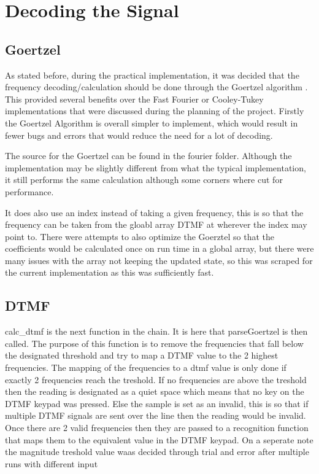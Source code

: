 \documentclass{cce2014-design}
\begin{document}
\section{Decoding the Signal}
\subsection{Goertzel}
As stated before, during the practical implementation, it was decided that the 
frequency decoding/calculation should be done through the Goertzel algorithm 
\cite{goertzel}. This provided several benefits over the 
Fast Fourier or Cooley-Tukey implementations that were discussed during the 
planning of the project. Firstly the Goertzel Algorithm is overall simpler to 
implement, which would result in fewer bugs and errors that would reduce the 
need for a lot of decoding.

The source for the Goertzel can be found in the fourier folder. Although the
implementation may be slightly different from what the typical implementation,
it still performs the same calculation although some corners where cut for
performance.

It does also use an index instead of taking a given frequency, this is so that
the frequency can be taken from the gloabl array DTMF at wherever the index may
point to. There were attempts to also optimize the Goerztel so that the
coefficients would be calculated once on run time in a global array, but there 
were many issues with the array not keeping the updated state, so this was scraped
for the current implementation as this was sufficiently fast.

\subsection{DTMF}
calc\_dtmf is the next function in the chain. It is here that parseGoertzel 
is then called. The purpose of this function is to remove the frequencies 
that fall below the designated threshold and try to map a DTMF value to the 
2 highest frequencies. The mapping of the frequencies to a dtmf value is only 
done if exactly 2 frequencies reach the treshold. If no frequencies are above 
the treshold then the reading is designated as a quiet space which means that 
no key on the DTMF keypad was pressed. Else the sample is set as an invalid, this 
is so that if multiple DTMF signals are sent over the line then the reading would
be invalid. Once there are 2 valid frequencies then they are passed to a 
recognition function that maps them to the equivalent value in the DTMF keypad.
On a seperate note the magnitude treshold value waas decided through trial and
error after multiple runs with different input
\end{document}
